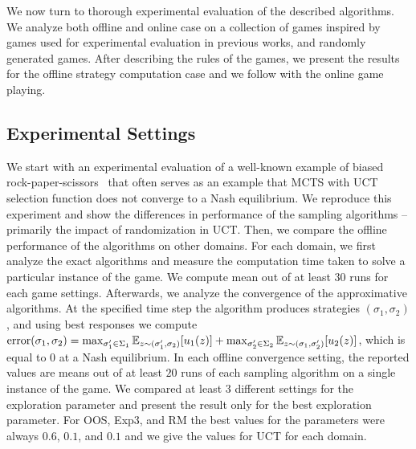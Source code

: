 
We now turn to thorough experimental evaluation of the described algorithms.
We analyze both offline and online case on a collection of games inspired by games used for experimental evaluation in previous works, and randomly generated games.
After describing the rules of the games, we present the results for the offline strategy computation case and we follow with the online game playing.

\subsection{Experimental Settings}

We start with an experimental evaluation of a well-known example of biased rock-paper-scissors~\cite{Shafiei09} that often serves as an example that MCTS with UCT selection function does not converge to a Nash equilibrium.
We reproduce this experiment and show the differences in performance of the sampling algorithms -- primarily the impact of randomization in UCT.
Then, we compare the offline performance of the algorithms on other domains.
For each domain, we first analyze the exact algorithms and measure the computation time taken to solve a particular instance of the game. 
We compute mean out of at least $30$ runs for each game settings. 
Afterwards, we analyze the convergence of the approximative algorithms.
At the specified time step the algorithm produces strategies $(\sigma_1,\sigma_2)$, and using best responses we compute 
$\textrm{error}(\sigma_1,\sigma_2) = \max_{\sigma_1' \in \Sigma_1} \mathbb{E}_{z \sim (\sigma_1',\sigma_2)}[u_1(z)] 
                                   + \max_{\sigma_2' \in \Sigma_2} \mathbb{E}_{z \sim (\sigma_1,\sigma_2')}[u_2(z)]$, 
which is equal to $0$ at a Nash equilibrium.
In each offline convergence setting, the reported values are means out of at least $20$ runs of each sampling algorithm on a single instance of the game.
We compared at least $3$ different settings for the exploration parameter and present the result only for the best exploration parameter.
For OOS, Exp3, and RM the best values for the parameters were always $0.6$, $0.1$, and $0.1$ and we give the values for UCT for each domain.

